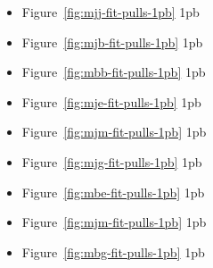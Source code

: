 \begin{multicols}{3}
    \begin{itemize}
    \item Figure~\ref{fig:mjj-fit-pulls-1pb} 1pb \mjj
    \item Figure~\ref{fig:mjb-fit-pulls-1pb} 1pb \mjb
    \item Figure~\ref{fig:mbb-fit-pulls-1pb} 1pb \mbb
    \item Figure~\ref{fig:mje-fit-pulls-1pb} 1pb \mje
    \item Figure~\ref{fig:mjm-fit-pulls-1pb} 1pb \mjmu
    \item Figure~\ref{fig:mjg-fit-pulls-1pb} 1pb \mjph
    \item Figure~\ref{fig:mbe-fit-pulls-1pb} 1pb \mbe
    \item Figure~\ref{fig:mjm-fit-pulls-1pb} 1pb \mbmu
    \item Figure~\ref{fig:mbg-fit-pulls-1pb} 1pb \mbph
    \end{itemize}
 \end{multicols}

 \newpage

 

 \newpage

